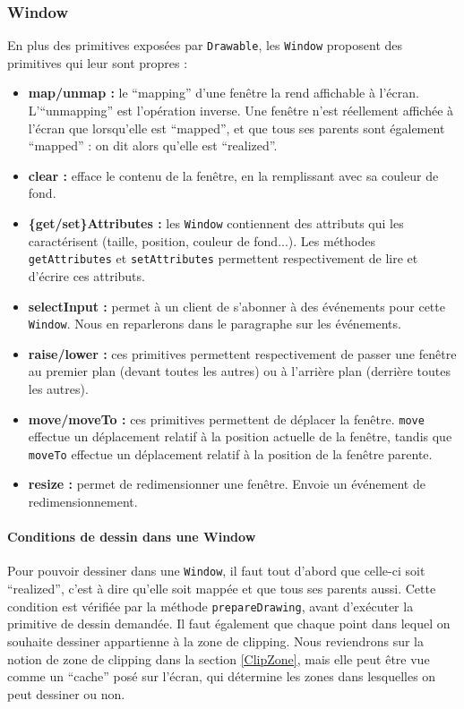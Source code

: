 \subsubsection{Window}

En plus des primitives exposées par \verb|Drawable|, les \verb|Window| proposent des primitives qui leur sont propres :
\begin{itemize}
  \item \textbf{map/unmap :} le ``mapping'' d'une fenêtre la rend affichable à l'écran. L'``unmapping'' est l'opération inverse. Une fenêtre n'est réellement affichée à l'écran que lorsqu'elle est ``mapped'', et que tous ses parents sont également ``mapped'' : on dit alors qu'elle est ``realized''.
  \item \textbf{clear :} efface le contenu de la fenêtre, en la remplissant avec sa couleur de fond.
  \item \textbf{\{get/set\}Attributes :} les \verb|Window| contiennent des attributs qui les caractérisent (taille, position, couleur de fond...). Les méthodes \verb|getAttributes| et \verb|setAttributes| permettent respectivement de lire et d'écrire ces attributs.
  \item \textbf{selectInput :} permet à un client de s'abonner à des événements pour cette \verb|Window|. Nous en reparlerons dans le paragraphe sur les événements.
  \item \textbf{raise/lower :} ces primitives permettent respectivement de passer une fenêtre au premier plan (devant toutes les autres) ou à l'arrière plan (derrière toutes les autres).
  \item \textbf{move/moveTo :} ces primitives permettent de déplacer la fenêtre. \verb|move| effectue un déplacement relatif à la position actuelle de la fenêtre, tandis que \verb|moveTo| effectue un déplacement relatif à la position de la fenêtre parente.
  \item \textbf{resize :} permet de redimensionner une fenêtre. Envoie un événement de redimensionnement.
\end{itemize}

\paragraph{Conditions de dessin dans une Window}
Pour pouvoir dessiner dans une \verb|Window|, il faut tout d'abord que celle-ci soit ``realized'', c'est à dire qu'elle soit mappée et que tous ses parents aussi. Cette condition est vérifiée par la méthode \verb|prepareDrawing|, avant d'exécuter la primitive de dessin demandée. Il faut également que chaque point dans lequel on souhaite dessiner appartienne à la zone de clipping. Nous reviendrons sur la notion de zone de clipping dans la section \ref{ClipZone}, mais elle peut être vue comme un ``cache'' posé sur l'écran, qui détermine les zones dans lesquelles on peut dessiner ou non.


